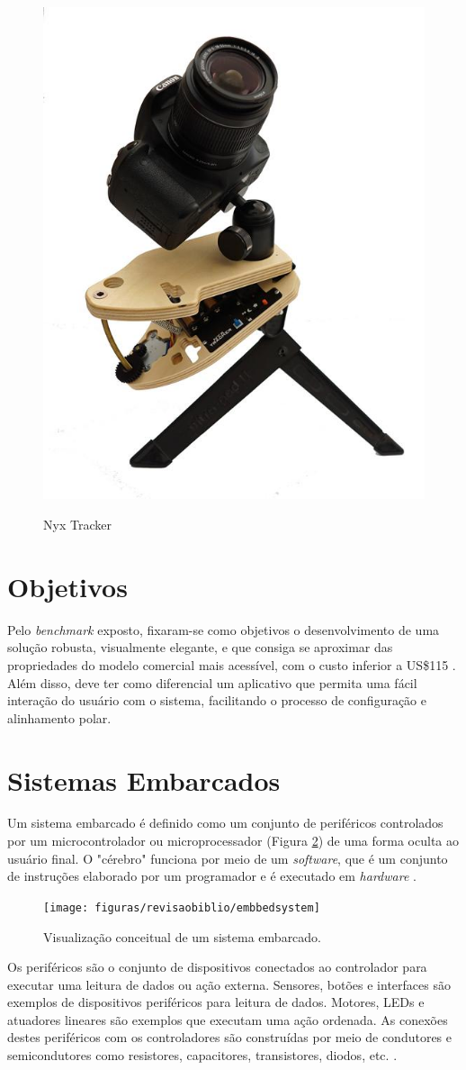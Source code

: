 \begin{figure}[h]
	\centering
	\caption{Nyx Tracker}
	\includegraphics[width=0.3\linewidth]{figuras/revisaobiblio/nyxtracker}
	\label{fig:nyxtracker}
\end{figure}


\section{Objetivos}

Pelo \textit{benchmark} exposto, fixaram-se como objetivos o desenvolvimento de uma solução robusta, visualmente elegante, e que consiga se aproximar das propriedades do modelo comercial mais acessível, com o custo inferior a US\$115 . Além disso, deve ter como diferencial um aplicativo que permita uma fácil interação do usuário com o sistema, facilitando o processo de configuração e alinhamento polar.

\section{Sistemas Embarcados}

Um sistema embarcado é definido como um conjunto de periféricos controlados por um microcontrolador ou microprocessador (Figura \ref{fig:embbedsystem}) de uma forma oculta ao usuário final. O "cérebro" funciona por meio de um \textit{software}, que é um conjunto de instruções elaborado por um programador e é executado em \textit{hardware} \cite{book:ANSIC}.

\begin{figure}[!htb]
	\centering
	\caption{Visualização conceitual de um sistema embarcado.}
	\texttt{[image: figuras/revisaobiblio/embbedsystem]}
	\label{fig:embbedsystem}
\end{figure}

Os periféricos são o conjunto de dispositivos conectados ao controlador para executar uma leitura de dados ou ação externa. Sensores, botões e interfaces são exemplos de dispositivos periféricos para leitura de dados. Motores, LEDs e atuadores lineares são exemplos que executam uma ação ordenada. As conexões destes periféricos com os controladores são construídas por meio de condutores e semicondutores como resistores, capacitores, transistores, diodos, etc. \cite{book:ANSIC}. 


